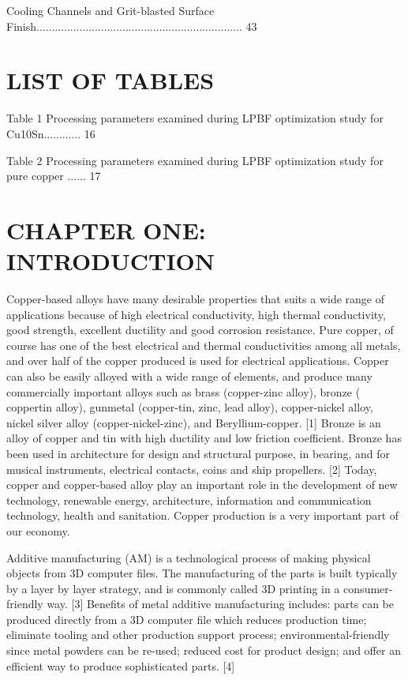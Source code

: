 \documentclass[10pt]{article}
\begin{document}
Cooling Channels and Grit-blasted Surface Finish................................................................... 43

\section*{LIST OF TABLES}
Table 1 Processing parameters examined during LPBF optimization study for Cu10Sn............ 16

Table 2 Processing parameters examined during LPBF optimization study for pure copper ...... 17

\section*{CHAPTER ONE: INTRODUCTION}
Copper-based alloys have many desirable properties that suits a wide range of applications because of high electrical conductivity, high thermal conductivity, good strength, excellent ductility and good corrosion resistance. Pure copper, of course has one of the best electrical and thermal conductivities among all metals, and over half of the copper produced is used for electrical applications. Copper can also be easily alloyed with a wide range of elements, and produce many commercially important alloys such as brass (copper-zinc alloy), bronze ( coppertin alloy), gunmetal (copper-tin, zinc, lead alloy), copper-nickel alloy, nickel silver alloy (copper-nickel-zinc), and Beryllium-copper. [1] Bronze is an alloy of copper and tin with high ductility and low friction coefficient. Bronze has been used in architecture for design and structural purpose, in bearing, and for musical instruments, electrical contacts, coins and ship propellers. [2] Today, copper and copper-based alloy play an important role in the development of new technology, renewable energy, architecture, information and communication technology, health and sanitation. Copper production is a very important part of our economy.

Additive manufacturing (AM) is a technological process of making physical objects from 3D computer files. The manufacturing of the parts is built typically by a layer by layer strategy, and is commonly called 3D printing in a consumer-friendly way. [3] Benefits of metal additive manufacturing includes: parts can be produced directly from a 3D computer file which reduces production time; eliminate tooling and other production support process; environmental-friendly since metal powders can be re-used; reduced cost for product design; and offer an efficient way to produce sophisticated parts. [4]
\end{document}
